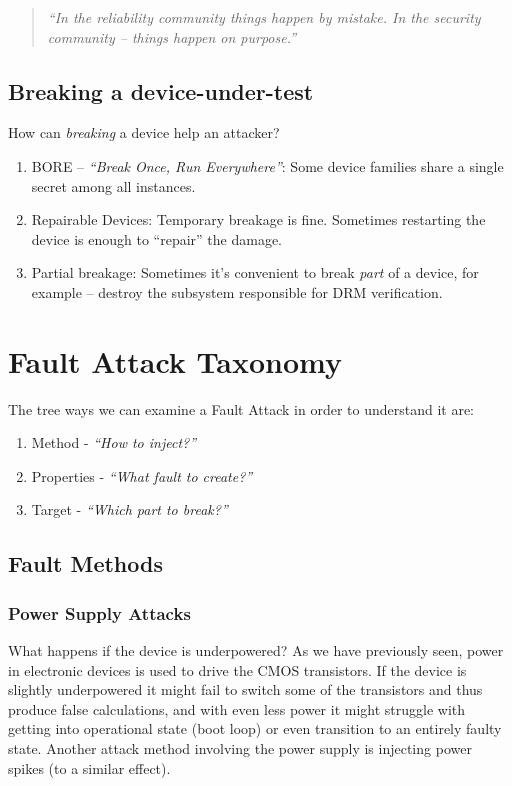 \begin{quote}
	\textit{``In the reliability community things happen by mistake. In the security community -- things happen on purpose.''}
\end{quote}

\subsection*{Breaking a device-under-test}\label{subsec:breaking_a_device_under_test}
How can \emph{breaking} a device help an attacker?

\begin{enumerate}
	\item BORE -- \textit{``Break Once, Run Everywhere''}: Some device families
	share a single secret among all instances.
	\item Repairable Devices: Temporary breakage is fine. Sometimes restarting
	the device is enough to ``repair'' the damage.
	\item Partial breakage: Sometimes it's convenient to break \emph{part} of a
	device, for example -- destroy the subsystem responsible for DRM
	verification.
\end{enumerate}

\section{Fault Attack Taxonomy}\label{sec:fault_attack_taxonomy}
The tree ways we can examine a Fault Attack in order to understand it are:
\begin{enumerate}
	\item Method - \emph{``How to inject?''}
	\item Properties - \emph{``What fault to create?''}
	\item Target - \emph{``Which part to break?''}
\end{enumerate}

\subsection{Fault Methods}\label{subsec:fault_methods}

\subsubsection{Power Supply Attacks}\label{subsubsec:power_supply_attacks}
What happens if the device is underpowered? As we have previously seen, power in
electronic devices is used to drive the CMOS transistors. If the device is
slightly underpowered it might fail to switch some of the transistors and thus
produce false calculations, and with even less power it might  struggle with
getting into operational state (boot loop) or even transition to an entirely
faulty state. Another attack method involving the power supply is injecting
power spikes (to a similar effect).

